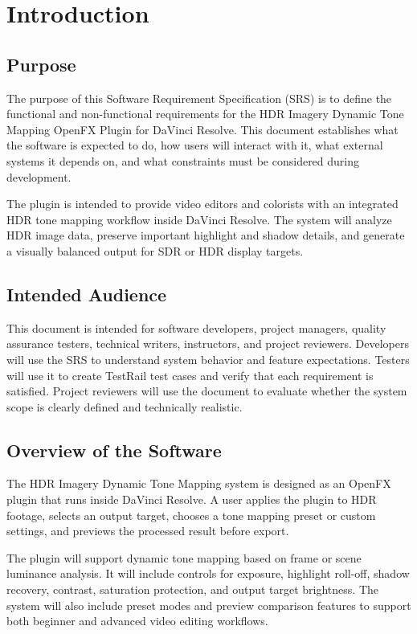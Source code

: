 \documentclass[12pt]{article}
\begin{document}
\section{Introduction}

\subsection{Purpose}
The purpose of this Software Requirement Specification (SRS) is to define the functional and non-functional requirements for the HDR Imagery Dynamic Tone Mapping OpenFX Plugin for DaVinci Resolve. This document establishes what the software is expected to do, how users will interact with it, what external systems it depends on, and what constraints must be considered during development.

The plugin is intended to provide video editors and colorists with an integrated HDR tone mapping workflow inside DaVinci Resolve. The system will analyze HDR image data, preserve important highlight and shadow details, and generate a visually balanced output for SDR or HDR display targets.

\subsection{Intended Audience}
This document is intended for software developers, project managers, quality assurance testers, technical writers, instructors, and project reviewers. Developers will use the SRS to understand system behavior and feature expectations. Testers will use it to create TestRail test cases and verify that each requirement is satisfied. Project reviewers will use the document to evaluate whether the system scope is clearly defined and technically realistic.

\subsection{Overview of the Software}
The HDR Imagery Dynamic Tone Mapping system is designed as an OpenFX plugin that runs inside DaVinci Resolve. A user applies the plugin to HDR footage, selects an output target, chooses a tone mapping preset or custom settings, and previews the processed result before export.

The plugin will support dynamic tone mapping based on frame or scene luminance analysis. It will include controls for exposure, highlight roll-off, shadow recovery, contrast, saturation protection, and output target brightness. The system will also include preset modes and preview comparison features to support both beginner and advanced video editing workflows.
\end{document}
